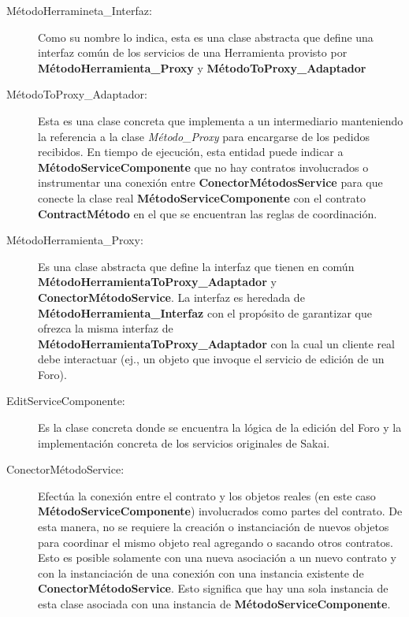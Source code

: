 \begin{description}

\item[MétodoHerramineta\_Interfaz:] Como su nombre lo indica, esta es una clase
abstracta que define una interfaz común de los servicios de una Herramienta
provisto por \textbf{MétodoHerramienta\_Proxy}
y \textbf{MétodoToProxy\_Adaptador}

\item[MétodoToProxy\_Adaptador:] Esta es una clase concreta que implementa a un
intermediario manteniendo la referencia a la clase \textit{Método\_Proxy} para
encargarse de los pedidos recibidos. En tiempo de ejecución, esta entidad puede
indicar a \textbf{MétodoServiceComponente} que no hay contratos involucrados o
instrumentar una conexión entre \textbf{ConectorMétodosService} para que conecte
la clase real \textbf{MétodoServiceComponente} con el contrato
\textbf{ContractMétodo} en el que se encuentran las reglas de coordinación.

\item[MétodoHerramienta\_Proxy:] Es una clase abstracta que define la interfaz
que tienen en común \textbf{MétodoHerramientaToProxy\_Adaptador} y
\textbf{ConectorMétodoService}. La interfaz es heredada de
\textbf{MétodoHerramienta\_Interfaz} con el propósito de garantizar que ofrezca
la misma interfaz de \textbf{MétodoHerramientaToProxy\_Adaptador} con la cual un
cliente real debe interactuar (ej., un objeto que invoque el servicio de edición
de un Foro).

\item[EditServiceComponente:] Es la clase concreta  donde se encuentra la lógica
de la edición del Foro y la implementación concreta de los servicios originales
de Sakai.

\item[ConectorMétodoService:] Efectúa la conexión entre el contrato y los
objetos reales (en este caso \textbf{MétodoServiceComponente}) involucrados como
partes del contrato. De esta manera, no se requiere la creación o instanciación
de nuevos objetos para coordinar el mismo objeto real agregando o sacando otros
contratos. Esto es posible solamente con una nueva asociación a un nuevo
contrato y con la instanciación de una conexión con una instancia existente de
\textbf{ConectorMétodoService}. Esto significa que hay una sola instancia de
esta clase asociada con una instancia de \textbf{MétodoServiceComponente}.



\end{description}
